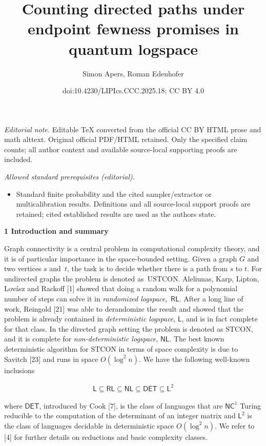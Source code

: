 \documentclass[10pt,a4paper]{article}
\title{Counting directed paths under endpoint fewness promises in quantum logspace}
\author{Simon Apers, Roman Edenhofer}
\date{doi:10.4230/LIPIcs.CCC.2025.18; CC BY 4.0}
\begin{document}
\maketitle
\noindent\textit{Editorial note.} Editable TeX converted from the official CC BY HTML prose and math alttext. Original official PDF/HTML retained. Only the specified claim counts; all author context and available source-local supporting proofs are included.\par\medskip
\noindent\textit{Allowed standard prerequisites (editorial).}\begin{itemize}
\item Standard finite probability and the cited sampler/extractor or multicalibration results. Definitions and all source-local support proofs are retained; cited established results are used as the authors state.
\end{itemize}\medskip


\par\medskip\noindent\textbf{
1 Introduction and summary}\par




Graph connectivity is a central problem in computational complexity theory, and it is of particular importance in the space-bounded setting.
Given a graph $G$ and two vertices $s$ and $t$, the task is to decide whether there is a path from $s$ to $t$.
For undirected graphs the problem is denoted as $\mathrm{USTCON}$. Aleliunas, Karp, Lipton, Lovász and Rackoff [1] showed that doing a random walk for a polynomial number of steps can solve it in \emph{randomized logspace}, $\mathsf{RL}$. After a long line of work, Reingold [21] was able to derandomize the result and showed that the problem is already contained in \emph{deterministic logspace}, $\mathsf{L}$, and is in fact complete for that class.
In the directed graph setting the problem is denoted as $\mathrm{STCON}$, and it is complete for \emph{non-deterministic logspace}, $\mathsf{NL}$. The best known deterministic algorithm for $\mathrm{STCON}$ in terms of space complexity is due to Savitch [23] and runs in space $O(\log^{2}n)$.
We have the following well-known inclusions\par


\[\begin{gathered}
\displaystyle\mathsf{L}\subseteq\mathsf{RL}\subseteq\mathsf{NL}\subseteq\mathsf{DET}\subseteq\mathsf{L}^{2}
\end{gathered}\]


where $\mathsf{DET}$, introduced by Cook [7], is the class of languages that are $\mathsf{NC}^{1}$ Turing reducible to the computation of the determinant of an integer matrix and $\mathsf{L}^{2}$ is the class of languages decidable in deterministic space $O(\log^{2}n)$.
We refer to [4] for further details on reductions and basic complexity classes.\par
\end{document}

